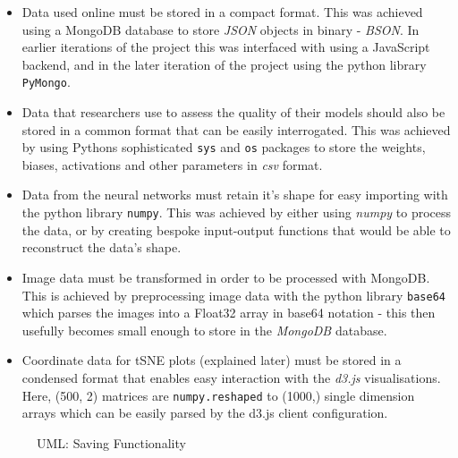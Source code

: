 \documentclass[a4paper,11pt,titlepage]{article}
\begin{document}
	\begin{itemize}
		\item Data used online must be stored in a compact format. This was achieved using a MongoDB database to store \textit{JSON} objects in binary - \textit{BSON}. In earlier iterations of the project this was interfaced with using a JavaScript backend, and in the later iteration of the project using the python library \texttt{PyMongo}.
		\item Data that researchers use to assess the quality of their models should also be stored in a common format that can be easily interrogated. This was achieved by using Pythons sophisticated \texttt{sys} and \texttt{os} packages to store the weights, biases, activations and other parameters in \textit{csv} format.
		\item Data from the neural networks must retain it's shape for easy importing with the python library \texttt{numpy}. This was achieved by either using \textit{numpy} to process the data, or by creating bespoke input-output functions that would be able to reconstruct the data's shape.
		\item Image data must be transformed in order to be processed with MongoDB. This is achieved by preprocessing image data with the python library \texttt{base64} which parses the images into a Float32 array in base64 notation - this then usefully becomes small enough to store in the \textit{MongoDB} database.
		\item Coordinate data for tSNE plots (explained later) must be stored in a condensed format that enables easy interaction with the \textit{d3.js} visualisations. Here, (500, 2) matrices are \texttt{numpy.reshaped} to (1000,) single dimension arrays which can be easily parsed by the d3.js client configuration.
	\end{itemize}
		
	\begin{figure}[H]
    			\caption{UML: Saving Functionality}%
	\end{figure}		
	
\end{document}
